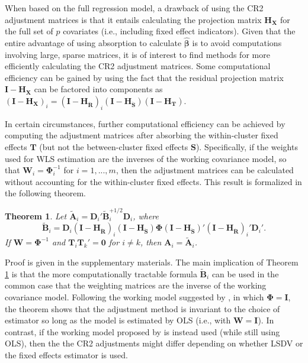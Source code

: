 \documentclass[12pt]{article}\usepackage[]{graphicx}\usepackage[]{color}
\newtheorem{thm}{Theorem}
\newcommand{\bm}{\mathbf}
\newcommand{\bs}{\boldsymbol}
\begin{document}
When based on the full regression model, a drawback of using the CR2 adjustment matrices is that it entails calculating the projection matrix $\bm{H_X}$ for the full set of $p$ covariates (i.e., including fixed effect indicators). 
Given that the entire advantage of using absorption to calculate $\hat{\bs\beta}$ is to avoid computations involving large, sparse matrices, it is of interest to find methods for more efficiently calculating the CR2 adjustment matrices. 
Some computational efficiency can be gained by using the fact that the residual projection matrix $\bm{I} - \bm{H_X}$ can be factored into components as $\left(\bm{I} - \bm{H_X}\right)_i = \left(\bm{I} - \bm{H_{\ddot{R}}}\right)_i \left(\bm{I} - \bm{H_{\ddot{S}}}\right) \left(\bm{I} - \bm{H_T}\right)$.

In certain circumstances, further computational efficiency can be achieved by computing the adjustment matrices after absorbing the within-cluster fixed effects $\bm{T}$ (but not the between-cluster fixed effects $\bm{S}$). 
Specifically, if the weights used for WLS estimation are the inverses of the working covariance model, so that $\bm{W}_i = \bs\Phi_i^{-1}$ for $i = 1,...,m$, then the adjustment matrices can be calculated without accounting for the within-cluster fixed effects. 
This result is formalized in the following theorem.  

\begin{thm}
\label{thm:absorb}
Let $\bm{\tilde{A}}_i = \bm{D}_i'\bm{\tilde{B}}_i^{+1/2} \bm{D}_i$, where 
\begin{equation}
\label{eq:CR2_B_tilde}
\bm{\tilde{B}}_i = \bm{D}_i\left(\bm{I} - \bm{H_{\ddot{R}}}\right)_i \left(\bm{I} - \bm{H_{\ddot{S}}}\right) \bs\Phi \left(\bm{I} - \bm{H_{\ddot{S}}}\right)' \left(\bm{I} - \bm{H_{\ddot{R}}}\right)_i' \bm{D}_i'.
\end{equation}
If $\bm{W} = \bs\Phi^{-1}$ and $\bm{T}_i \bm{T}_k' = \bm{0}$ for $i \neq k$, then $\bm{A}_i = \bm{\tilde{A}}_i$. 
\end{thm}

Proof is given in the supplementary materials.
The main implication of Theorem \ref{thm:absorb} is that the more computationally tractable formula $\bm{\tilde{B}}_i$ can be used in the common case that the weighting matrices are the inverse of the working covariance model.
Following the working model suggested by \citet{Bell2002bias}, in which $\bs\Phi = \bm{I}$, the theorem shows that the adjustment method is invariant to the choice of estimator so long as the model is estimated by OLS (i.e., with $\bm{W} = \bm{I}$).
In contrast, if the working model proposed by \citet{Imbens2015robust} is instead used (while still using OLS), then the the CR2 adjustments might differ depending on whether LSDV or the fixed effects estimator is used.
\end{document}
